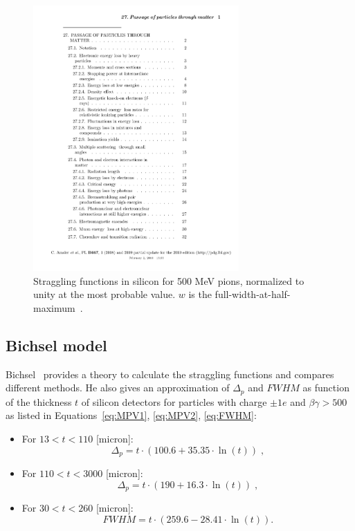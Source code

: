 \begin{figure}[htbp]
  \centering
  \includegraphics[width=0.7\textwidth, page=14, trim = 50mm 160mm
  40mm 20mm, clip]{Articles/rpp2009-rev-passage-particles-matter.pdf}
  \caption{Straggling functions in silicon for 500 MeV pions,
    normalized to unity at the most probable value. $w$
    is the full-width-at-half-maximum~\cite{Beringer:1900zz}.}
  \label{fig:LandauDistribution}
\end{figure}

\subsection{Bichsel model}
Bichsel~\cite{Bichsel} provides a theory to calculate the
straggling functions and compares different methods. He also gives an
approximation of $\Delta_{p}$ and $FWHM$ as function of the thickness
$t$ of silicon detectors for particles with charge $\pm1e$ and
$\beta\gamma>500$ as listed in Equations~\ref{eq:MPV1}, \ref{eq:MPV2},
\ref{eq:FWHM}:

\begin{itemize}
\item For $13<t<110$ [micron]:
  \begin{equation}
    \Delta_{p}=t \cdot (100.6+35.35 \cdot \ln(t))\; ,
    \label{eq:MPV1}
  \end{equation}
\item For $110<t<3000$ [micron]:
  \begin{equation}
    \Delta_{p}=t \cdot (190+16.3 \cdot \ln(t))\; ,
    \label{eq:MPV2}
  \end{equation}
\item For $30<t<260$ [micron]:
  \begin{equation}
    FWHM=t \cdot (259.6-28.41 \cdot \ln(t)).
    \label{eq:FWHM}
  \end{equation}
\end{itemize}

